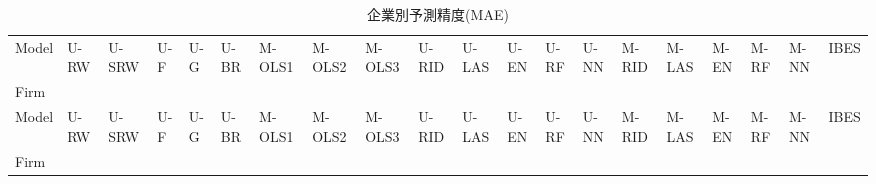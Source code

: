 %
\tiny
\begin{longtable}[c]{lp{3mm}p{3mm}p{3mm}p{3mm}p{3mm}p{3mm}p{3mm}p{3mm}p{3mm}p{3mm}p{3mm}p{3mm}p{3mm}p{3mm}p{3mm}p{3mm}p{3mm}p{3mm}p{3mm}}
\caption{企業別予測精度(MAE)}
\label{tab:mae_by_firm}
\\
\toprule
Model &   U-RW &  U-SRW & U-F & U-G & U-BR &  M-OLS1 &  M-OLS2 &   M-OLS3 & U-RID & U-LAS &   U-EN &   U-RF &    U-NN & M-RID & M-LAS &   M-EN &   M-RF &    M-NN &   IBES \\
Firm            &        &        &           &           &            &         &         &          &         &         &        &        &         &         &         &        &        &         &        \\
\midrule
\endfirsthead
\toprule
Model &   U-RW &  U-SRW & U-F & U-G & U-BR &  M-OLS1 &  M-OLS2 &   M-OLS3 & U-RID & U-LAS &   U-EN &   U-RF &    U-NN & M-RID & M-LAS &   M-EN &   M-RF &    M-NN &   IBES \\
Firm            &        &        &           &           &            &         &         &          &         &         &        &        &         &         &         &        &        &         &        \\
\midrule
\endhead

\end{longtable}
